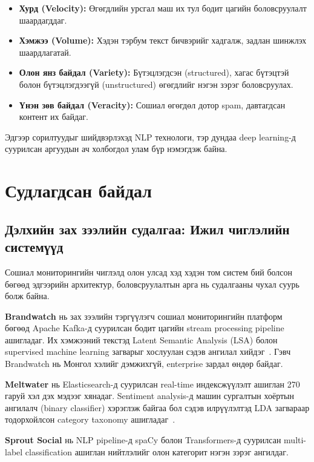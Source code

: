 \begin{itemize}
    \item \textbf{Хурд (Velocity):} Өгөгдлийн урсгал маш их тул бодит цагийн боловсруулалт шаардагддаг.
    \item \textbf{Хэмжээ (Volume):} Хэдэн тэрбум текст бичвэрийг хадгалж, задлан шинжлэх шаардлагатай.
    \item \textbf{Олон янз байдал (Variety):} Бүтэцлэгдсэн (structured), хагас бүтэцтэй болон бүтэцлэгдээгүй (unstructured) өгөгдлийг нэгэн зэрэг боловсруулах.
    \item \textbf{Үнэн зөв байдал (Veracity):} Сошиал өгөгдөл дотор spam, давтагдсан контент их байдаг.
\end{itemize}

Эдгээр сорилтуудыг шийдвэрлэхэд NLP технологи, тэр дундаа deep learning-д суурилсан аргуудын ач холбогдол улам бүр нэмэгдэж байна.

\section{Судлагдсан байдал}

\subsection{Дэлхийн зах зээлийн судалгаа: Ижил чиглэлийн системүүд}

Сошиал мониторингийн чиглэлд олон улсад хэд хэдэн том систем бий болсон бөгөөд эдгээрийн архитектур, боловсруулалтын арга нь судалгааны чухал суурь болж байна.

\textbf{Brandwatch} нь зах зээлийн тэргүүлэгч сошиал мониторингийн платформ бөгөөд Apache Kafka-д суурилсан бодит цагийн stream processing pipeline ашигладаг. Их хэмжээний текстэд Latent Semantic Analysis (LSA) болон supervised machine learning загварыг хослуулан сэдэв ангилал хийдэг~\cite{brandwatch2023}. Гэвч Brandwatch нь Монгол хэлийг дэмжихгүй, enterprise зардал өндөр байдаг.

\textbf{Meltwater} нь Elasticsearch-д суурилсан real-time индексжүүлэлт ашиглан 270 гаруй хэл дэх мэдээг хянадаг. Sentiment analysis-д машин сургалтын хоёртын ангилалч (binary classifier) хэрэглэж байгаа бол сэдэв илрүүлэлтэд LDA загвараар тодорхойлсон category taxonomy ашигладаг~\cite{meltwater2022}.

\textbf{Sprout Social} нь NLP pipeline-д spaCy болон Transformers-д суурилсан multi-label classification ашиглан нийтлэлийг олон категорит нэгэн зэрэг ангилдаг.

